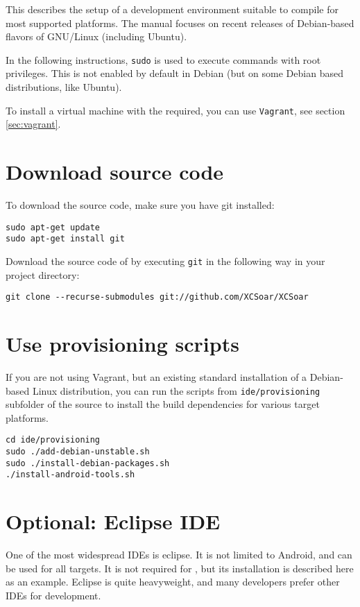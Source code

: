 This describes the setup of a development environment suitable to compile \xc
for most supported platforms. The manual focuses on recent releases of
Debian-based flavors of GNU/Linux (including Ubuntu).

In the following instructions, \texttt{sudo} is used to execute commands with
root privileges. This is not enabled by default in Debian (but on some Debian
based distributions, like Ubuntu).

To install a virtual machine with the required, you can use \texttt{Vagrant},
see section \ref{sec:vagrant}.

\section{Download source code}
To download the \xc source code, make sure you have git installed:
\begin{verbatim}
sudo apt-get update
sudo apt-get install git
\end{verbatim}

Download the source code of \xc by executing \texttt{git} in the following way in
your project directory:
\begin{verbatim}
git clone --recurse-submodules git://github.com/XCSoar/XCSoar
\end{verbatim}

\section{Use provisioning scripts}
If you are not using Vagrant, but an existing standard installation of a
Debian-based Linux distribution, you can run the scripts from
\texttt{ide/provisioning} subfolder of the \xc source to install the build
dependencies for various \xc target platforms.

\begin{verbatim}
cd ide/provisioning
sudo ./add-debian-unstable.sh
sudo ./install-debian-packages.sh
./install-android-tools.sh
\end{verbatim}

\section{Optional: Eclipse IDE}
One of the most widespread IDEs is eclipse. It is not limited to Android, and can be used for all targets. It is not required for \xc, but its installation is described here as an example. Eclipse is quite heavyweight, and many developers prefer other IDEs for \xc development.

